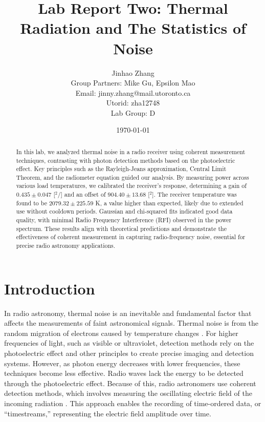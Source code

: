 \documentclass[10pt, preprint]{aastex}
\title{Lab Report Two:  Thermal Radiation and The Statistics of Noise}
\author{
Jinhao Zhang \\
Group Partners: Mike Gu, Epsilon Mao \\
Email: jinny.zhang@mail.utoronto.ca \\
Utorid: zha12748 \\
Lab Group: D \\
}
\date{\centering \today}
\begin{document}
\begin{abstract}
In this lab, we analyzed thermal noise in a radio receiver using coherent measurement techniques, contrasting with photon detection methods based on the photoelectric effect. Key principles such as the Rayleigh-Jeans approximation, Central Limit Theorem, and the radiometer equation guided our analysis. By measuring power across various load temperatures, we calibrated the receiver’s response, determining a gain of \(0.435 \pm 0.047\) [$^2$/] and an offset of \(904.40 \pm 13.68\) [$^2$]. The receiver temperature was found to be \(2079.32 \pm 225.59\) K, a value higher than expected, likely due to extended use without cooldown periods. Gaussian and chi-squared fits indicated good data quality, with minimal Radio Frequency Interference (RFI) observed in the power spectrum. These results align with theoretical predictions and demonstrate the effectiveness of coherent measurement in capturing radio-frequency noise, essential for precise radio astronomy applications.
\end{abstract}

\maketitle

\section{Introduction}

In radio astronomy, thermal noise is an inevitable and fundamental factor that affects the measurements of faint astronomical signals. Thermal noise is from the random migration of electrons caused by temperature changes \cite{ast325lecture5}. For higher frequencies of light, such as visible or ultraviolet, detection methods rely on the photoelectric effect and other principles to create precise imaging and detection systems.  However, as photon energy decreases with lower frequencies, these techniques become less effective. Radio waves lack the energy to be detected through the photoelectric effect. Because of this, radio astronomers use coherent detection methods, which involves measuring the oscillating electric field of the incoming radiation \cite{ast325lecture7}. This approach enables the recording of time-ordered data, or “timestreams,” representing the electric field amplitude over time.
\end{document}

